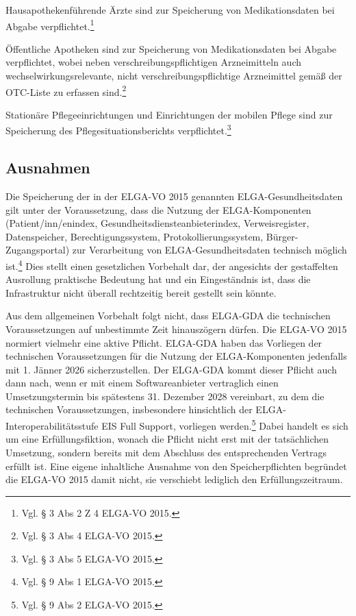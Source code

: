 Hausapothekenführende Ärzte sind zur Speicherung von Medikationsdaten bei Abgabe verpflichtet.\footnote{Vgl. § 3 Abs 2 Z 4 ELGA-VO 2015.}

Öffentliche Apotheken sind zur Speicherung von Medikationsdaten bei Abgabe verpflichtet, wobei neben verschreibungspflichtigen Arzneimitteln auch wechselwirkungsrelevante, nicht verschreibungspflichtige Arzneimittel gemäß der OTC-Liste zu erfassen sind.\footnote{Vgl. § 3 Abs 4 ELGA-VO 2015.}

Stationäre Pflegeeinrichtungen und Einrichtungen der mobilen Pflege sind zur Speicherung des Pflegesituationsberichts verpflichtet.\footnote{Vgl. § 3 Abs 5 ELGA-VO 2015.}

        \subsection{Ausnahmen}
Die Speicherung der in der ELGA-VO 2015 genannten ELGA-Gesundheitsdaten gilt unter der Voraussetzung, dass die Nutzung der ELGA-Komponenten (Patient/inn/enindex, Gesundheitsdiensteanbieterindex, Verweisregister, Datenspeicher, Berechtigungssystem, Protokollierungssystem, Bürger-Zugangsportal) zur Verarbeitung von ELGA-Gesundheitsdaten technisch möglich ist.\footnote{Vgl. § 9 Abs 1 ELGA-VO 2015.} Dies stellt einen gesetzlichen Vorbehalt dar, der angesichts der gestaffelten Ausrollung praktische Bedeutung hat und ein Eingeständnis ist, dass die Infrastruktur nicht überall rechtzeitig bereit gestellt sein könnte.

Aus dem allgemeinen Vorbehalt folgt nicht, dass ELGA-GDA die technischen Voraussetzungen auf unbestimmte Zeit hinauszögern dürfen. Die ELGA-VO 2015 normiert vielmehr eine aktive Pflicht. ELGA-GDA haben das Vorliegen der technischen Voraussetzungen für die Nutzung der ELGA-Komponenten jedenfalls mit 1. Jänner 2026 sicherzustellen. Der ELGA-GDA kommt dieser Pflicht auch dann nach, wenn er mit einem Softwareanbieter vertraglich einen Umsetzungstermin bis spätestens 31. Dezember 2028 vereinbart, zu dem die technischen Voraussetzungen, insbesondere hinsichtlich der ELGA-Interoperabilitätsstufe \glqq EIS Full Support\grqq, vorliegen werden.\footnote{Vgl. § 9 Abs 2 ELGA-VO 2015.} Dabei handelt es sich um eine Erfüllungsfiktion, wonach die Pflicht nicht erst mit der tatsächlichen Umsetzung, sondern bereits mit dem Abschluss des entsprechenden Vertrags erfüllt ist. Eine eigene inhaltliche Ausnahme von den Speicherpflichten begründet die ELGA-VO 2015 damit nicht, sie verschiebt lediglich den Erfüllungszeitraum.

